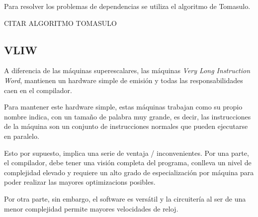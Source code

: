 \bigskip
Para resolver los problemas de dependencias se utiliza el algoritmo de Tomasulo.

CITAR ALGORITMO TOMASULO 

\subsection{VLIW}

A diferencia de las máquinas superescalares, las máquinas \textit{Very Long Instruction Word},
mantienen un hardware simple de emisión y todas las responsabilidades caen en el compilador.

\bigskip
Para mantener este hardware simple, estas máquinas trabajan como su propio nombre indica, con
un tamaño de palabra muy grande, es decir, las instrucciones de la máquina son un conjunto
de instrucciones normales que pueden ejecutarse en paralelo.

\bigskip
Esto por supuesto, implica una serie de ventaja / inconvenientes. Por una parte, el compilador,
debe tener una visión completa del programa, conlleva un nivel de complejidad elevado y requiere
un alto grado de especialización por máquina para poder realizar las mayores optimizacions posibles.

\bigskip
Por otra parte, sin embargo, el software es versátil y la circuitería al ser de una menor complejidad 
permite mayores velocidades de reloj.